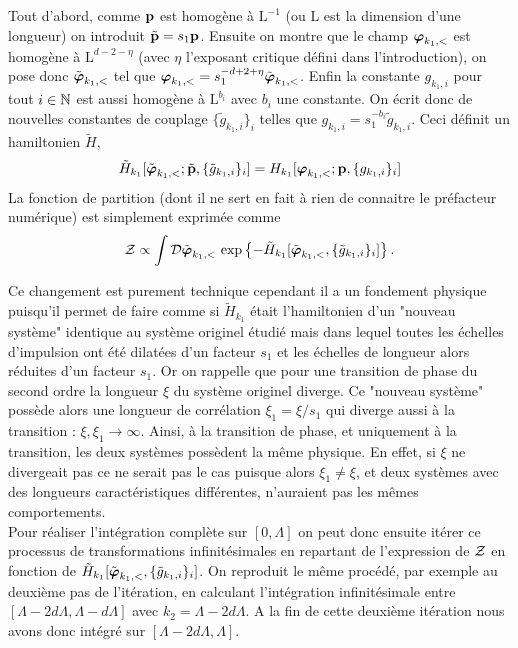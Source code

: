 \documentclass[10pt]{article}
\begin{document}
\begin{multicols}{2}
 Tout d'abord, comme ${\bf p}$ est homogène à $\text{L}^{-1}$ (ou L est la dimension d'une longueur) on introduit $\tilde{{\bf p}} = s_1 {\bf p}$. Ensuite on montre que le champ $\boldsymbol{ \varphi}_{k_1, <}$ est homogène à $\text{L}^{d-2-\eta}$ (avec $\eta$ l'exposant critique défini dans l'introduction), on pose donc $\tilde{\boldsymbol{ \varphi}}_{k_1, <}$ tel que $\boldsymbol{ \varphi}_{k_1, <} = s_1^{-d+2+\eta} \tilde{\boldsymbol{ \varphi}}_{k_1, <}$. Enfin la constante $g_{k_1, i}$ pour tout $i\in \mathbb{N}$ est aussi homogène à $\text{L}^{b_i}$ avec $b_i$ une constante. On écrit donc de nouvelles constantes de couplage $\{\tilde{g}_{k_1, i}\}_i$ telles que $g_{k_1, i} = s_1^{-b_i} \tilde{g}_{k_1, i}$. Ceci définit un hamiltonien $\tilde{H}$,
 \begin{equation}
 	\tilde{H}_{k_1}[\tilde{\boldsymbol{ \varphi}}_{k_1,<}; \tilde{{\bf p}}, \{\tilde{g}_{k_1, i}\}_i ] = H_{k_1}[\boldsymbol{ \varphi}_{k_1,<}; {\bf p}, \{g_{k_1,i}\}_i]
 \end{equation}
La fonction de partition (dont il ne sert en fait à rien de connaitre le préfacteur numérique) est simplement exprimée comme 
\begin{equation}
\mathcal{Z} \propto \int \mathcal{D} \tilde{\boldsymbol{ \varphi}}_{k_1,<} \, \exp\left\{- \tilde{H}_{k_1}[\tilde{\boldsymbol{ \varphi}}_{k_1,<}, \{\tilde{g}_{k_1, i}\}_i ] \right\}. 
\end{equation} 


Ce changement est purement technique cependant il a un fondement physique puisqu'il permet de faire comme si $\tilde{H}_{k_1}$ était l'hamiltonien d'un "nouveau système" identique au système originel étudié mais dans lequel toutes les échelles d'impulsion ont été dilatées d'un facteur $s_1$ et les échelles de longueur alors réduites d'un facteur $s_1$. Or on rappelle que pour une transition de phase du second ordre la longueur $\xi$ du système originel diverge. Ce "nouveau système" possède alors une longueur de corrélation $\xi_1 = \xi/s_1$ qui diverge aussi à la transition : $\xi, \xi_1 \to \infty$. Ainsi, à la transition de phase, et uniquement à la transition, les deux systèmes possèdent la même physique. En effet, si $\xi$ ne divergeait pas ce ne serait pas le cas puisque alors $\xi_1 \neq \xi$, et deux systèmes avec des longueurs caractéristiques différentes, n'auraient pas les mêmes comportements. \\

 Pour réaliser l'intégration complète sur $[0, \Lambda]$ on peut donc ensuite itérer ce processus de transformations infinitésimales en repartant de l'expression de $\mathcal{Z}$ en fonction de $\tilde{H}_{k_1}[\tilde{\boldsymbol{ \varphi}}_{k_1,<}, \{\tilde{g}_{k_1, i}\}_i ]$. On reproduit le même procédé, par exemple au deuxième pas de l'itération, en calculant l'intégration infinitésimale entre $[\Lambda - 2d\Lambda, \Lambda - d\Lambda]$ avec $k_2 = \Lambda - 2d\Lambda$. A la fin de cette deuxième itération nous avons donc intégré sur $[\Lambda - 2d\Lambda, \Lambda]$.  \\
 

\end{multicols}
\end{document}
